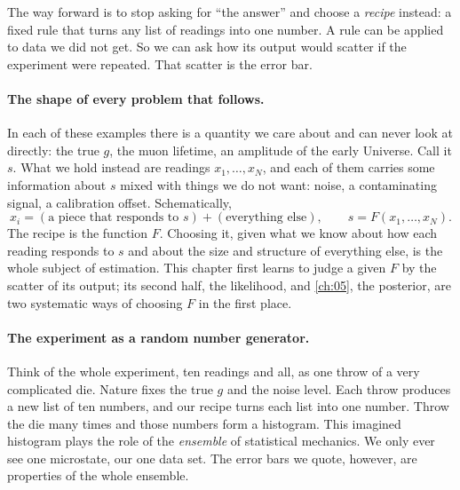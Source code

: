 The way forward is to stop asking for ``the answer'' and choose a
\emph{recipe} instead: a fixed rule that turns any list of readings into one
number. A rule can be applied to data we did not get. So we can ask how its
output would scatter if the experiment were repeated. That scatter is the
error bar.

\paragraph{The shape of every problem that follows.}
In each of these examples there is a quantity we care about and can never
look at directly: the true $g$, the muon lifetime, an amplitude of the early
Universe. Call it $s$. What we hold instead are readings $x_1,\dots,x_N$, and
each of them carries some information about $s$ mixed with things we do not
want: noise, a contaminating signal, a calibration offset. Schematically,
\begin{equation}
  x_i = (\text{a piece that responds to } s) + (\text{everything else}),
  \qquad
  \hat s=F(x_1,\dots,x_N).
  \label{3a:eq:hidden-s}
\end{equation}
The recipe is the function $F$. Choosing it, given what we know about how each
reading responds to $s$ and about the size and structure of everything else,
is the whole subject of estimation. This chapter first learns to judge a
given $F$ by the scatter of its output; its second half, the likelihood, and
\cref{ch:05}, the posterior, are two systematic ways of choosing $F$ in the
first place.

\paragraph{The experiment as a random number generator.}
Think of the whole experiment, ten readings and all, as one throw of a very
complicated die. Nature fixes the true $g$ and the noise level. Each throw
produces a new list of ten numbers, and our recipe turns each list into one
number. Throw the die many times and those numbers form a histogram. This
imagined histogram plays the role of the \emph{ensemble} of statistical
mechanics. We only ever see one microstate, our one data set. The error bars
we quote, however, are properties of the whole ensemble.

